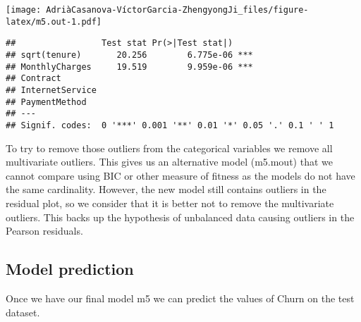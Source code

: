 \documentclass[
]{article}
\newenvironment{Shaded}{\begin{snugshade}}{\end{snugshade}}
\newcommand{\AttributeTok}[1]{\textcolor[rgb]{0.13,0.29,0.53}{#1}}
\newcommand{\CommentTok}[1]{\textcolor[rgb]{0.56,0.35,0.01}{\textit{#1}}}
\newcommand{\DecValTok}[1]{\textcolor[rgb]{0.00,0.00,0.81}{#1}}
\newcommand{\FloatTok}[1]{\textcolor[rgb]{0.00,0.00,0.81}{#1}}
\newcommand{\FunctionTok}[1]{\textcolor[rgb]{0.13,0.29,0.53}{\textbf{#1}}}
\newcommand{\NormalTok}[1]{#1}
\newcommand{\OtherTok}[1]{\textcolor[rgb]{0.56,0.35,0.01}{#1}}
\newcommand{\SpecialCharTok}[1]{\textcolor[rgb]{0.81,0.36,0.00}{\textbf{#1}}}
\newcommand{\StringTok}[1]{\textcolor[rgb]{0.31,0.60,0.02}{#1}}
\begin{document}
\texttt{[image: AdriàCasanova-VíctorGarcia-ZhengyongJi\_files/figure-latex/m5.out-1.pdf]}

\begin{verbatim}
##                 Test stat Pr(>|Test stat|)    
## sqrt(tenure)       20.256        6.775e-06 ***
## MonthlyCharges     19.519        9.959e-06 ***
## Contract                                      
## InternetService                               
## PaymentMethod                                 
## ---
## Signif. codes:  0 '***' 0.001 '**' 0.01 '*' 0.05 '.' 0.1 ' ' 1
\end{verbatim}

To try to remove those outliers from the categorical variables we remove
all multivariate outliers. This gives us an alternative model (m5.mout)
that we cannot compare using BIC or other measure of fitness as the
models do not have the same cardinality. However, the new model still
contains outliers in the residual plot, so we consider that it is better
not to remove the multivariate outliers. This backs up the hypothesis of
unbalanced data causing outliers in the Pearson residuals.

\hypertarget{model-prediction}{%
\subsection{Model prediction}\label{model-prediction}}

Once we have our final model m5 we can predict the values of Churn on
the test dataset.

\begin{Shaded}
\end{Shaded}
\end{document}
